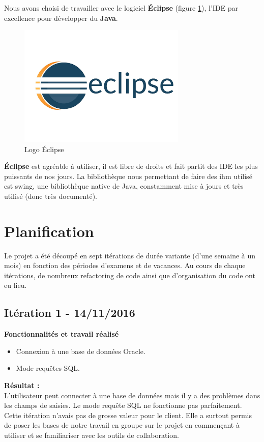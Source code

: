 Nous avons choisi de travailler avec le logiciel \textbf{Éclipse} (figure \ref{eclipse_logo}), l'\gls{IDE} par excellence pour développer du \textbf{Java}.

\begin{figure}[H]
\centering
\includegraphics[width=8cm]{images/activite/eclipseLogo.png}
\caption{Logo Éclipse}
\label{eclipse_logo}
\end{figure}

\textbf{Éclipse} est agréable à utiliser, il est libre de droits et fait partit des IDE les plus puissants de nos jours.
La bibliothèque nous permettant de faire des \gls{ihm} utilisé est swing, une bibliothèque native de Java, constamment mise à jours et très utilisé (donc très documenté).

\section{Planification}
Le projet a été découpé en sept itérations de durée variante (d'une semaine à un mois) en fonction des périodes d'examens et de vacances. Au cours de chaque itérations, de nombreux refactoring de code ainsi que d'organisation du code ont eu lieu.


\subsection{Itération 1 - 14/11/2016}

\textbf{Fonctionnalités et travail réalisé}
\begin{itemize}
\item Connexion à une base de données Oracle.
\item Mode requêtes SQL.\\
\end{itemize}

\textbf{Résultat :}\\
L'utilisateur peut connecter à une base de données mais il y a des problèmes dans les champs de saisies. Le mode requête SQL ne fonctionne pas parfaitement.
Cette itération n'avais pas de grosse valeur pour le client. Elle a surtout permis de poser les bases de notre travail en groupe sur le projet en commençant à utiliser et se familiariser avec les outils de collaboration.


